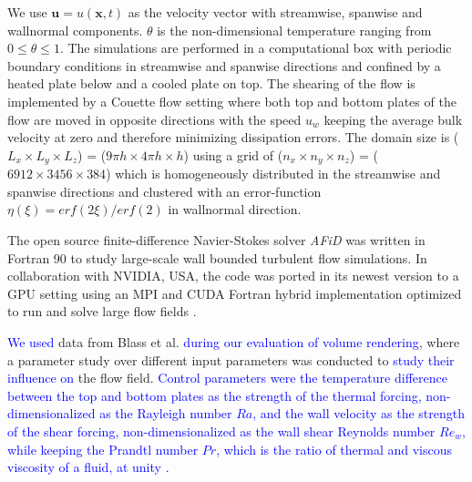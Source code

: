 \documentclass[5p,times]{elsarticle}
\begin{document}
We use $ \boldsymbol{u}=u(\boldsymbol{x},t) $ as the velocity vector with streamwise, spanwise and wallnormal components. $ \theta $ is the non-dimensional temperature ranging from $ 0 \leq \theta \leq 1 $. The simulations are performed in a computational box with periodic boundary conditions in streamwise and spanwise directions and confined by a heated plate below and a cooled plate on top. The shearing of the flow is implemented by a Couette flow setting where both top and bottom plates of the flow are moved in opposite directions with the speed $ u_w $ keeping the average bulk velocity at zero and therefore minimizing dissipation errors. The domain size is ($ L_x \times L_y \times L_z $) = ($ 9\pi h \times 4\pi h \times h $) using a grid of ($ n_x \times n_y \times n_z $) = ($ 6912 \times 3456 \times 384 $) which is homogeneously distributed in the streamwise and spanwise directions and clustered with an error-function $ \eta(\xi)=erf(2\xi)/erf(2) $ in wallnormal direction.

The open source finite-difference Navier-Stokes solver \textit{AFiD} \cite{poe15c} was written in Fortran 90 to study large-scale wall bounded turbulent flow simulations. In collaboration with NVIDIA, USA, the code was ported in its newest version to a GPU setting using an MPI and CUDA Fortran hybrid implementation optimized to run and solve large flow fields \cite{zhu18b}.

\textcolor{blue}{We used} data from Blass et al. \cite{bla19} \textcolor{blue}{during our evaluation of volume rendering}, where a parameter study over different input parameters was conducted to \textcolor{blue}{study their influence on} the flow field. \textcolor{blue}{Control parameters were the temperature difference between the top and bottom plates as the strength of the thermal forcing, non-dimensionalized as the Rayleigh number $Ra$, and the wall velocity as the strength of the shear forcing, non-dimensionalized as the wall shear Reynolds number $Re_w$, while keeping the Prandtl number $Pr$, which is the ratio of thermal and viscous viscosity of a fluid, at unity \cite{bla19}.} 


%
%
\end{document}
